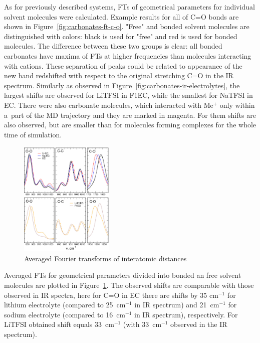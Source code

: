 As for previously described systems, FTs of geometrical parameters for individual solvent molecules were calculated. Example results for all of C=O bonds are shown in Figure~\ref{fig:carbonates-ft-c-o}. "Free" and bonded solvent molecules are distinguished with colors: black is used for "free" and red is used for bonded molecules. The difference between these two groups is clear: all bonded carbonates have maxima of FTs at higher frequencies than molecules interacting with cations. These separation of peaks could be related to appearance of the new band redshifted with respect to the original stretching C=O in the IR spectrum. Similarly as observed in Figure~\ref{fig:carbonates-ir-electrolytes}, the largest shifts are observed for LiTFSI in F1EC, while the smallest for NaTFSI in EC. There were also carbonate molecules, which interacted with Me$^{+}$ only within a~part of the MD trajectory and they are marked in magenta. For them shifts are also observed, but are smaller than for molecules forming complexes for the whole time of simulation.

\begin{figure}[ht]
    \centering
    \includegraphics[width=0.4\textwidth]{img/4-ir-spectra-from-aimd-simulations/3-carbonates/ft-averages.png}
    \caption{Averaged Fourier transforms of interatomic distances}
    \label{fig:carbonates-ft-averages}
\end{figure}


Averaged FTs for geometrical parameters divided into bonded an free solvent molecules are plotted in Figure~\ref{fig:carbonates-ft-averages}. The observed shifts are comparable with those observed in IR spectra, here for C=O in EC there are shifts by 35 cm$^{-1}$ for lithium electrolyte (compared to 25~cm$^{-1}$ in IR spectrum) and 21~cm$^{-1}$ for sodium electrolyte (compared to 16~cm$^{-1}$ in IR spectrum), respectively. For LiTFSI obtained shift equals 33~cm$^{-1}$ (with 33~cm$^{-1}$ observed in the IR spectrum).


